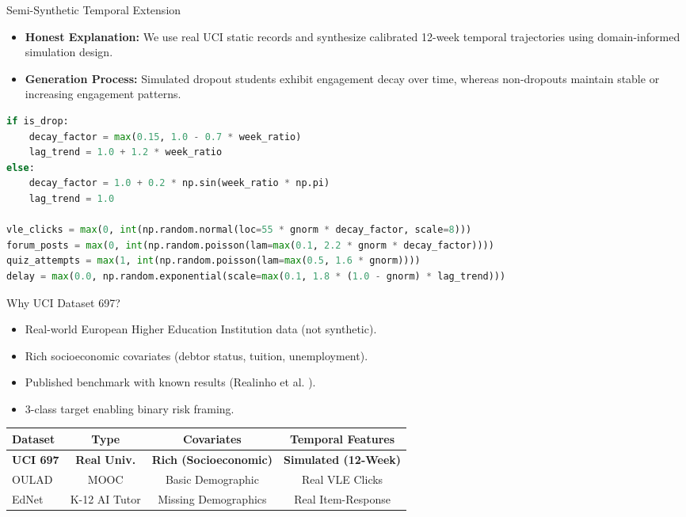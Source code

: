 \documentclass[aspectratio=169, 10pt]{beamer}
\begin{document}
\begin{frame}[fragile]{Semi-Synthetic Temporal Extension}
  \begin{itemize}
    \item \textbf{Honest Explanation:} We use real UCI static records and synthesize calibrated 12-week temporal trajectories using domain-informed simulation design.
    \item \textbf{Generation Process:} Simulated dropout students exhibit engagement decay over time, whereas non-dropouts maintain stable or increasing engagement patterns.
  \end{itemize}

\begin{lstlisting}[language=Python]
if is_drop:
    decay_factor = max(0.15, 1.0 - 0.7 * week_ratio)
    lag_trend = 1.0 + 1.2 * week_ratio
else:
    decay_factor = 1.0 + 0.2 * np.sin(week_ratio * np.pi)
    lag_trend = 1.0
    
vle_clicks = max(0, int(np.random.normal(loc=55 * gnorm * decay_factor, scale=8)))
forum_posts = max(0, int(np.random.poisson(lam=max(0.1, 2.2 * gnorm * decay_factor))))
quiz_attempts = max(1, int(np.random.poisson(lam=max(0.5, 1.6 * gnorm))))
delay = max(0.0, np.random.exponential(scale=max(0.1, 1.8 * (1.0 - gnorm) * lag_trend)))
\end{lstlisting}
\end{frame}

\begin{frame}{Why UCI Dataset 697?}
  \begin{itemize}
    \item Real-world European Higher Education Institution data (not synthetic).
    \item Rich socioeconomic covariates (debtor status, tuition, unemployment).
    \item Published benchmark with known results (Realinho et al. \cite{realinho2022predicting}).
    \item 3-class target enabling binary risk framing.
  \end{itemize}
  \vspace{0.3cm}
  \begin{center}
    \small
    \begin{tabular}{l c c c}
      \toprule
      \textbf{Dataset} & \textbf{Type} & \textbf{Covariates} & \textbf{Temporal Features} \\
      \midrule
      \textbf{UCI 697} & \textbf{Real Univ.} & \textbf{Rich (Socioeconomic)} & \textbf{Simulated (12-Week)} \\
      OULAD & MOOC & Basic Demographic & Real VLE Clicks \\
      EdNet & K-12 AI Tutor & Missing Demographics & Real Item-Response \\
      \bottomrule
    \end{tabular}
  \end{center}
\end{frame}
\end{document}
